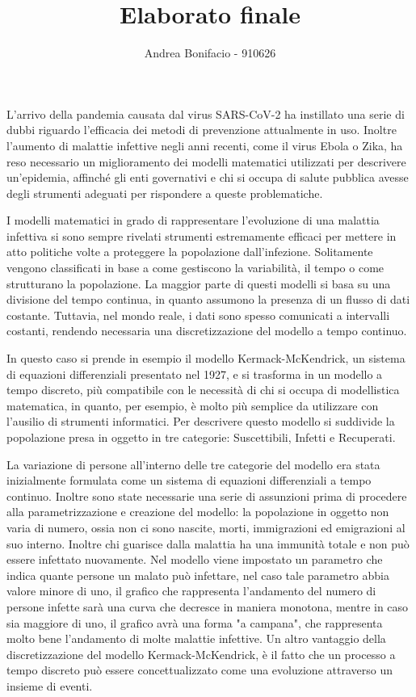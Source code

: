 \documentclass[a4paper,12pt]{article}
\theoremstyle{break}
\numberwithin{equation}{section}
\begin{document}
\title{Elaborato finale}
\author{Andrea Bonifacio - 910626}
\date{}
\maketitle

L'arrivo della pandemia causata dal virus SARS-CoV-2 ha instillato una serie di dubbi riguardo l'efficacia dei metodi di prevenzione attualmente in uso. Inoltre l'aumento di malattie infettive negli anni recenti, come il virus Ebola o Zika, ha reso necessario un miglioramento dei modelli matematici utilizzati per descrivere un'epidemia, affinché gli enti governativi e chi si occupa di salute pubblica avesse degli strumenti adeguati per rispondere a queste problematiche.  

I modelli matematici in grado di rappresentare l'evoluzione di una malattia infettiva si sono sempre rivelati strumenti estremamente efficaci per mettere in atto politiche volte a proteggere la popolazione dall'infezione. Solitamente vengono classificati in base a come gestiscono la variabilità, il tempo o come strutturano la popolazione. La maggior parte di questi modelli si basa su una divisione del tempo continua, in quanto assumono la presenza di un flusso di dati costante. Tuttavia, nel mondo reale, i dati sono spesso comunicati a intervalli costanti, rendendo necessaria una discretizzazione del modello a tempo continuo.  

In questo caso si prende in esempio il modello Kermack-McKendrick, un sistema di equazioni differenziali presentato nel 1927, e si trasforma in un modello a tempo discreto, più compatibile con le necessità di chi si occupa di modellistica matematica, in quanto, per esempio, è molto più semplice da utilizzare con l'ausilio di strumenti informatici. Per descrivere questo modello si suddivide la popolazione presa in oggetto in tre categorie: Suscettibili, Infetti
e Recuperati. 

La variazione di persone all'interno delle tre categorie del modello era stata inizialmente formulata come un sistema di equazioni differenziali a tempo continuo.  
Inoltre sono state necessarie una serie di assunzioni prima di procedere alla parametrizzazione e creazione del modello: la popolazione in oggetto non varia di numero, ossia non ci sono nascite, morti, immigrazioni ed emigrazioni al suo interno. Inoltre chi guarisce dalla malattia ha una immunità totale e non può essere infettato nuovamente.  
Nel modello viene impostato un parametro che indica quante persone un malato può infettare, nel caso tale parametro abbia valore minore di uno, il grafico che rappresenta l'andamento del numero di persone infette sarà una curva che decresce in maniera monotona, mentre in caso sia maggiore di uno, il grafico avrà una forma "a campana", che rappresenta molto bene l'andamento di molte malattie infettive. Un altro vantaggio della discretizzazione del modello Kermack-McKendrick, è il fatto che un processo a tempo discreto può essere concettualizzato come una evoluzione attraverso un insieme di eventi.  
\end{document}
